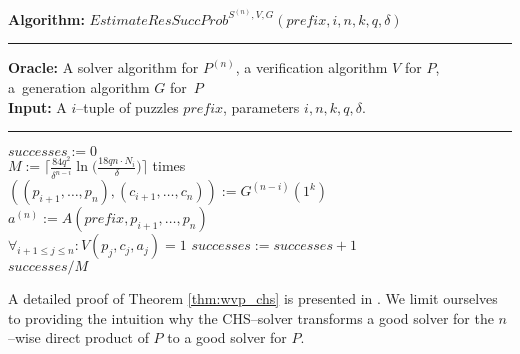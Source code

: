 %
\begin{codeblock}
  \textbf{Algorithm:} $\mathit{EstimateResSuccProb}^{S^{(n)},V, G}(\mathit{prefix}, i, n, k, q, \delta)$
  \medskip \hrule
  \textbf{Oracle:} A solver algorithm for $P^{(n)}$, a verification algorithm $V$ for $P$, a~generation algorithm $G$ for~$P$\\
  \textbf{Input:} A $i$--tuple of puzzles $\mathit{prefix}$, parameters $i, n, k, q, \delta$.
  \medskip\hrule
  $successes := 0$ \\
  \Repeat $M := \Big\lceil \frac{84q^2}{\delta^{n-i}} \ln \Big(\frac{18qn \cdot N_i}{\delta} \Big) \Big\rceil$ times \\
  \IndI $((p_{i+1}, \dotsc, p_n), (c_{i+1}, \dotsc, c_n)) := G^{(n-i)}(1^k)$\\
  \IndI $a^{(n)} := A(\mathit{prefix}, p_{i+1}, \dotsc, p_{n})$\\
  \IndI \If $\forall_{i + 1\leq j \leq n} : V(p_j, c_j, a_j) = 1$ \Then $\mathit{successes := successes + 1}$ \\
  \Return $successes / M$
\end{codeblock}
%
A detailed proof of Theorem \ref{thm:wvp_chs} is presented in \cite{canetti2004hardness}.
We limit ourselves to providing the intuition why the CHS--solver transforms a good solver
for the $n$--wise direct product of $P$ to a good solver for $P$.

